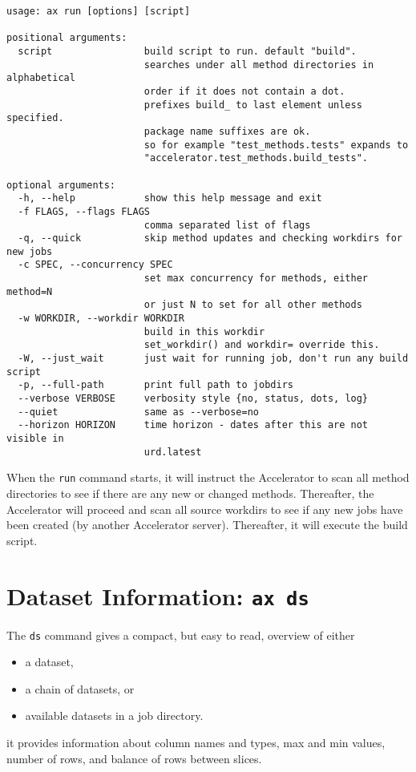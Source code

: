 \begin{snugshade}
\begin{verbatim}
usage: ax run [options] [script]

positional arguments:
  script                build script to run. default "build".
                        searches under all method directories in alphabetical
                        order if it does not contain a dot.
                        prefixes build_ to last element unless specified.
                        package name suffixes are ok.
                        so for example "test_methods.tests" expands to
                        "accelerator.test_methods.build_tests".

optional arguments:
  -h, --help            show this help message and exit
  -f FLAGS, --flags FLAGS
                        comma separated list of flags
  -q, --quick           skip method updates and checking workdirs for new jobs
  -c SPEC, --concurrency SPEC
                        set max concurrency for methods, either method=N
                        or just N to set for all other methods
  -w WORKDIR, --workdir WORKDIR
                        build in this workdir
                        set_workdir() and workdir= override this.
  -W, --just_wait       just wait for running job, don't run any build script
  -p, --full-path       print full path to jobdirs
  --verbose VERBOSE     verbosity style {no, status, dots, log}
  --quiet               same as --verbose=no
  --horizon HORIZON     time horizon - dates after this are not visible in
                        urd.latest
\end{verbatim}
\end{snugshade}
When the \texttt{run} command starts, it will instruct the Accelerator
to scan all method directories to see if there are any new or changed
methods.  Thereafter, the Accelerator will proceed and scan all source
workdirs to see if any new jobs have been created (by another
Accelerator server).  Thereafter, it will execute the build script.




\section{Dataset Information: \texttt{ax ds}}
The \texttt{ds} command gives a compact, but easy to read,
overview of either
\begin{itemize}
\item[] a dataset,
\item[] a chain of datasets, or
\item[] available datasets in a job directory.
\end{itemize}
it provides information about column names and types, max and min
values, number of rows, and balance of rows between slices.


